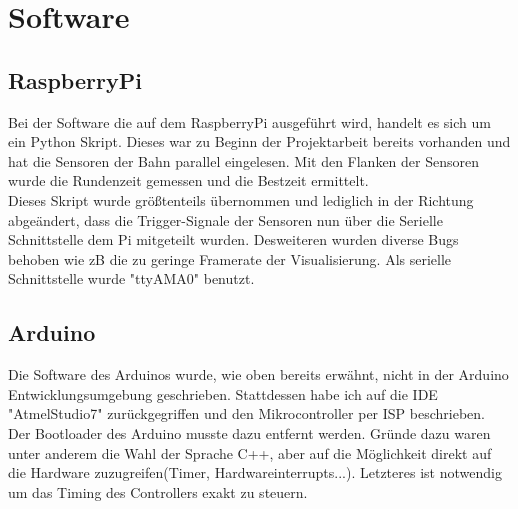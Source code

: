 \documentclass[a4paper, 11pt]{scrartcl}
\begin{document}
\section{Software}
	\subsection{RaspberryPi}
		
		Bei der Software die auf dem RaspberryPi ausgeführt wird, handelt es sich um ein Python Skript. 
		Dieses war zu Beginn der Projektarbeit bereits vorhanden und hat die Sensoren 
		der Bahn parallel eingelesen. Mit den Flanken der Sensoren wurde die Rundenzeit gemessen 
		und die Bestzeit ermittelt.\\
		Dieses Skript wurde größtenteils übernommen und lediglich in der Richtung abgeändert, 
		dass die Trigger-Signale der Sensoren nun über die Serielle Schnittstelle dem Pi mitgeteilt wurden. 
		Desweiteren wurden diverse Bugs behoben wie zB die zu geringe Framerate der Visualisierung. 
		Als serielle Schnittstelle wurde "ttyAMA0" benutzt.
		\newpage	
	\subsection{Arduino}
		Die Software des Arduinos wurde, wie oben bereits erwähnt, nicht in der Arduino Entwicklungsumgebung 
		geschrieben. Stattdessen habe ich auf die IDE "AtmelStudio7" zurückgegriffen und den Mikrocontroller 
		per ISP beschrieben. Der Bootloader des Arduino musste dazu entfernt werden.
		Gründe dazu waren unter anderem die Wahl der Sprache C++, 
		aber auf die Möglichkeit direkt auf die Hardware zuzugreifen(Timer, Hardwareinterrupts...). 
		Letzteres ist notwendig um das Timing des Controllers exakt zu steuern.\\
\end{document}
